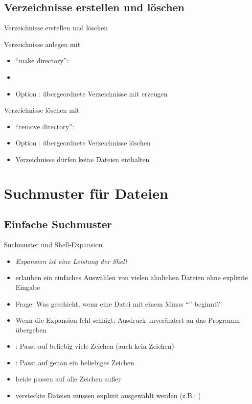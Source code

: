 \documentclass[aspectratio=43]{beamer}
\begin{document}
\subsection{Verzeichnisse erstellen und löschen}
\begin{frame}{Verzeichnisse erstellen und löschen}
  \begin{block}{Verzeichnisse anlegen mit }
    \begin{itemize}
      \item ``make directory'': 
      \item {}
      \item Option : übergeordnete Verzeichnisse mit erzeugen
    \end{itemize}
  \end{block}
  \begin{block}{Verzeichnisse löschen mit }
    \begin{itemize}
      \item ``remove directory'': 
      \item Option : übergeordnete Verzeichnisse löschen
      \item Verzeichnisse dürfen keine Dateien enthalten
    \end{itemize}
  \end{block}
\end{frame}

\section{Suchmuster für Dateien}
\subsection{Einfache Suchmuster}
\begin{frame}{Suchmuster und Shell-Expansion}
    \begin{itemize}
      \item \emph{Expansion ist eine Leistung der Shell}
      \item erlauben ein einfaches Auswählen von vielen ähnlichen Dateien ohne explizite Eingabe
      \item Frage: Was geschieht, wenn eine Datei mit einem Minus ``\co{-}'' beginnt?
      \item Wenn die Expansion fehl schlägt: Ausdruck unverändert an das Programm übergeben
      \item \co{*}: Passt auf beliebig viele Zeichen (auch kein Zeichen)
      \item {}: Passt auf genau ein beliebiges Zeichen
      \item beide passen auf alle Zeichen außer \co{/}
      \item versteckte Dateien müssen explizit ausgewählt werden (z.B.: )
    \end{itemize}
\end{frame}
\end{document}
